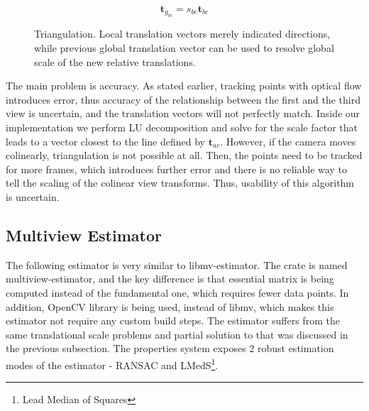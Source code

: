 \documentclass[11pt,english]{report}
\begin{document}
\begin{equation}
	\mathbf{t}_{g_{bc}} = s_{bc}\mathbf{t}_{bc}
\end{equation}

\begin{figure}[!ht]
	\centering
	\caption{\centering Triangulation. Local translation vectors merely indicated directions, while previous global translation vector can be used to resolve global scale of the new relative translations.}
\end{figure}

The main problem is accuracy. As stated earlier, tracking points with optical flow introduces error, thus accuracy of the relationship between the first and the third view is uncertain, and the translation vectors will not perfectly match. Inside our implementation we perform LU decomposition and solve for the scale factor that leads to a vector closest to the line defined by $\mathbf{t}_{ac}$. However, if the camera moves colinearly, triangulation is not possible at all. Then, the points need to be tracked for more frames, which introduces further error and there is no reliable way to tell the scaling of the colinear view transforms. Thus, usability of this algorithm is uncertain.

\subsection{Multiview Estimator}

The following estimator is very similar to libmv-estimator. The crate is named multiview-estimator, and the key difference is that essential matrix is being computed instead of the fundamental one, which requires fewer data points. In addition, OpenCV library is being used, instead of libmv, which makes this estimator not require any custom build steps. The estimator suffers from the same translational scale problems and partial solution to that was discussed in the previous subsection. The properties system exposes 2 robust estimation modes of the estimator - RANSAC and LMedS\footnote{Lead Median of Squares}.
\end{document}
